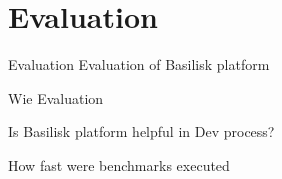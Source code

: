 \section{Evaluation}
\begin{frame}{Evaluation}
	Evaluation of Basilisk platform
	
	Wie Evaluation
	
	Is Basilisk platform helpful in Dev process?
	
	How fast were benchmarks executed
\end{frame}